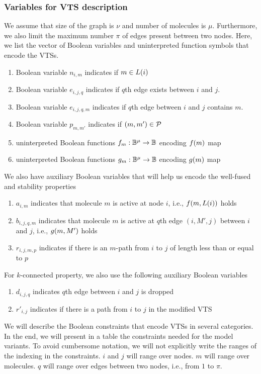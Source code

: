 \subsubsection{Variables for VTS description}
%
We assume that size of the graph is $\nu$ and number of molecules is
$\mu$.
%
Furthermore, we also limit the maximum number $\pi$ of edges present
between two nodes.
%
Here, we list the vector of Boolean variables and uninterpreted function symbols
that encode the VTSs.
\begin{enumerate}

\item Boolean variable $n_{i,m}$ indicates if $m \in L(i)$
\item Boolean variable $e_{i,j,q}$ indicates if $q$th edge exists between $i$ and $j$.
\item Boolean variable $e_{i,j,q,m}$ indicates if $q$th edge between $i$ and $j$ contains $m$.
\item Boolean variable $p_{m,m'}$ indicates if $(m,m') \in \mathcal{P}$
\item uninterpreted Boolean functions $f_m : \mathbb{B}^\mu \rightarrow \mathbb{B}$
encoding $f(m)$ map
\item uninterpreted Boolean functions $g_m : \mathbb{B}^\mu \rightarrow \mathbb{B}$
encoding $g(m)$ map
\end{enumerate}
We also have auxiliary Boolean variables that will help us encode the well-fused and stability properties 
\begin{enumerate}
\item $a_{i,m}$ indicates that molecule $m$ is active at node $i$, i.e., $f(m,L(i))$
  holds
\item $b_{i,j,q,m}$ indicates that molecule $m$ is active at $q$th edge $(i,M',j)$ between $i$ and $j$, i.e., $g(m,M')$ holds
\item $r_{i,j,m,p}$ indicates if there is an $m$-path from
  $i$ to $j$ of length less than or equal to $p$
\end{enumerate}
For $k$-connected property, we also use the following auxiliary Boolean variables
\begin{enumerate}
\item $d_{i,j,q}$ indicates $q$th edge between $i$ and $j$ is dropped
\item $r'_{i,j}$ indicates if there is a path from $i$ to $j$ in the modified VTS
\end{enumerate}

We will describe the Boolean constraints that encode VTSs in several categories.
%
In the end, we will present in a table the constraints needed for the
model variants.
%
To avoid cumbersome notation, we will not explicitly write the ranges of the indexing
in the constraints.
%
$i$ and $j$ will range over nodes.
%
$m$ will range over molecules.
%
$q$ will range over edges between two nodes, i.e., from $1$ to $\pi$.
%

